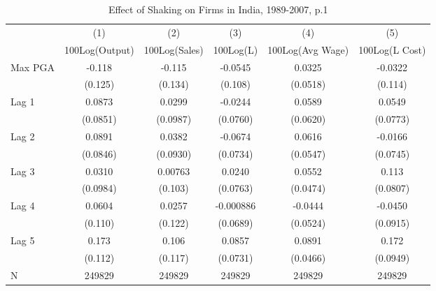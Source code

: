 \begin{table}[htbp]\centering
\def\sym#1{\ifmmode^{#1}\else\(^{#1}\)\fi}
\caption{Effect of Shaking on Firms in India, 1989-2007, p.1}
\begin{tabular}{l*{5}{c}}
\toprule
                &\multicolumn{1}{c}{(1)}&\multicolumn{1}{c}{(2)}&\multicolumn{1}{c}{(3)}&\multicolumn{1}{c}{(4)}&\multicolumn{1}{c}{(5)}\\
                &\multicolumn{1}{c}{100Log(Output)}&\multicolumn{1}{c}{100Log(Sales)}&\multicolumn{1}{c}{100Log(L)}&\multicolumn{1}{c}{100Log(Avg Wage)}&\multicolumn{1}{c}{100Log(L Cost)}\\
\midrule
Max PGA         &   -0.118         &   -0.115         &  -0.0545         &   0.0325         &  -0.0322         \\
                &  (0.125)         &  (0.134)         &  (0.108)         & (0.0518)         &  (0.114)         \\
\addlinespace
Lag 1           &   0.0873         &   0.0299         &  -0.0244         &   0.0589         &   0.0549         \\
                & (0.0851)         & (0.0987)         & (0.0760)         & (0.0620)         & (0.0773)         \\
\addlinespace
Lag 2           &   0.0891         &   0.0382         &  -0.0674         &   0.0616         &  -0.0166         \\
                & (0.0846)         & (0.0930)         & (0.0734)         & (0.0547)         & (0.0745)         \\
\addlinespace
Lag 3           &   0.0310         &  0.00763         &   0.0240         &   0.0552         &    0.113         \\
                & (0.0984)         &  (0.103)         & (0.0763)         & (0.0474)         & (0.0807)         \\
\addlinespace
Lag 4           &   0.0604         &   0.0257         &-0.000886         &  -0.0444         &  -0.0450         \\
                &  (0.110)         &  (0.122)         & (0.0689)         & (0.0524)         & (0.0915)         \\
\addlinespace
Lag 5           &    0.173         &    0.106         &   0.0857         &   0.0891         &    0.172         \\
                &  (0.112)         &  (0.117)         & (0.0731)         & (0.0466)         & (0.0949)         \\
\midrule
N               &   249829         &   249829         &   249829         &   249829         &   249829         \\

\end{tabular}
\end{table}
